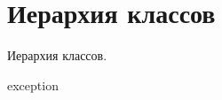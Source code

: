 \section{Иерархия классов}
Иерархия классов.\begin{DoxyCompactList}
\item exception\begin{DoxyCompactList}
\item {}
\end{DoxyCompactList}
\item {}
\end{DoxyCompactList}
